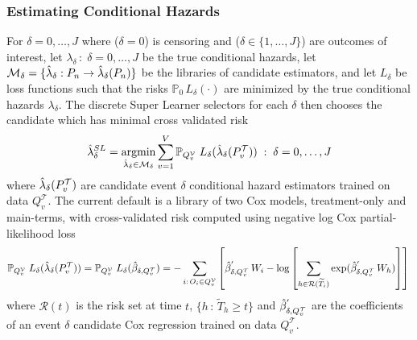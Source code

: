\documentclass{report}
\DeclareMathOperator*{\argmin}{argmin}
\newcommand{\1}{\ensuremath{\mathbf{1}}}
\newcommand{\T}{\ensuremath{\widetilde{T}}}
\renewcommand{\L}{\ensuremath{W}}
\begin{document}
\subsubsection{Estimating Conditional Hazards}
\label{haz-est}
For \(\delta = 0, \dots, J\) where (\(\delta = 0\)) is censoring and (\(\delta \in \{1, \dots, J\}\)) are outcomes of interest, let \(\lambda_{\delta} \,:\; \delta = 0, \dots, J\) be the true conditional hazards, let \(\mathcal{M}_\delta = \{\Hat{\lambda}_\delta : P_n \to \Hat\lambda_{\delta}(P_n)\}\) be the libraries of candidate estimators, and let \(L_{\delta}\) be loss functions such that the risks \(\mathbb{P}_0\,L_{\delta}(\cdot)\) are minimized by the true conditional hazards \(\lambda_{\delta}\). The discrete Super Learner selectors for each \(\delta\) then chooses the candidate which has minimal cross validated risk 
\begin{equation}
\Hat{\lambda}_\delta^{SL} = \argmin_{\Hat{\lambda}_\delta \in \mathcal{M}_\delta} \sum_{v = 1}^{V} \mathbb{P}_{Q^\mathcal{V}_v} \; L_{ \delta}(\Hat{\lambda}_{\delta}(P^\mathcal{T}_v)) \;:\; \delta = 0, \dots, J\label{hazsl}
\end{equation}
where \(\Hat{\lambda}_\delta(P^\mathcal{T}_v)\) are candidate event \(\delta\) conditional hazard estimators trained on data \(Q^\mathcal{T}_v\). The current  default is a library of two Cox models, treatment-only and main-terms, with cross-validated risk computed using negative log Cox partial-likelihood loss
\[ \mathbb{P}_{Q^\mathcal{V}_v} \; L_{ \delta}(\Hat{\lambda}_{\delta}(P^\mathcal{T}_v)) =  \mathbb{P}_{Q^\mathcal{V}_v} \; L_{ \delta}(\Hat{\beta}_{\delta, Q^\mathcal{T}_v}) = - \sum_{i: \, O_i \in Q^\mathcal{V}_v} \left[\Hat{\beta}^{'}_{\delta, Q^\mathcal{T}_v}\,\L_i - \log\left[\sum_{h \in \mathcal{R}(\T_i)} \exp(\Hat{\beta}^{'}_{\delta, Q^\mathcal{T}_v}\,\L_h)\right]\right] \,\]
where \(\mathcal{R}(t)\) is the risk set at time \(t\), \(\{h \,:\, \T_h \geq t\}\) and \(\Hat{\beta}^{'}_{\delta, Q^\mathcal{T}_v}\) are the coefficients of an event \(\delta\) candidate Cox regression trained on data \(Q^\mathcal{T}_v\). 
\end{document}
